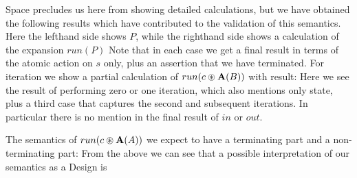 Space precludes us here from showing detailed calculations,
but we have obtained the following results which have
contributed to the validation of this semantics.
Here the lefthand side shows $P$, while the righthand side
shows a calculation of the expansion $run(P)$
Note that in each case we get a final result in terms of the
atomic action on $s$ only,
plus an assertion that we have terminated.
For iteration we show a partial calculation
of $run(c \circledast \mathbf{A}(B))$ with result:
Here we see the result
of performing zero or one iteration, which also mentions only state,
plus a third case that captures the second and subsequent iterations.
In particular there is no mention in the final result of $in$ or $out$.

The semantics of $run(c \circledast \mathbf{A}(A))$ we expect to have a terminating part
and a non-terminating part:
From the above we can see that a possible interpretation of our semantics as a
Design is

